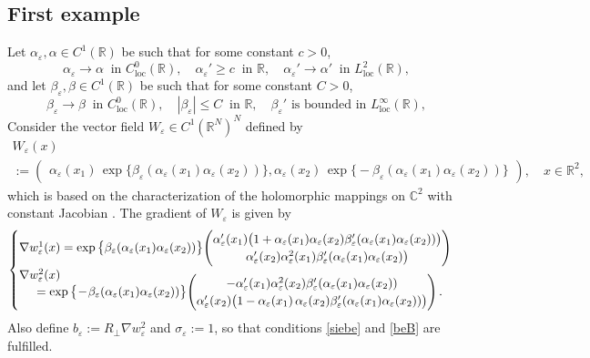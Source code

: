 \documentclass[JEP,XML,SOM,Unicode]{cedram}
\newcommand{\loc}{\mathrm{loc}}
\let\al\alpha
\let \be \beta
\def \RR {\mathbb R}
\def \CC {\mathbb C}
\theoremstyle{plain}
\theoremstyle{definition}
\begin{document}
\subsection{First example}\label{ss.exa1}
Let $\al_\varepsilon,\al\in C^1(\RR)$ be such that for some constant $c>0$,
\begin{equation}\label{ae}
\al_\varepsilon\to\al\;\;\mbox{in }C^0_\loc(\RR),\quad \al_\varepsilon'\geq c\;\;\mbox{in }\RR,\quad\al_\varepsilon'\to\al'\;\;\mbox{in }L^2_\loc(\RR),
\end{equation}
and let $\be_\varepsilon,\be\in C^1(\RR)$ be such that for some constant $C>0$,
\begin{equation}\label{bee}
\be_\varepsilon\to\be\;\;\mbox{in }C^0_\loc(\RR),\quad |\be_\varepsilon|\leq C\;\;\mbox{in }\RR,\quad \be_\varepsilon'\mbox{ is bounded in }L^\infty_\loc(\RR),
\end{equation}
Consider the vector field $W_\varepsilon\in C^1(\RR^N)^N$ defined by
\begin{multline}\label{Wecj}
W_\varepsilon(x)\\
:=\begin{pmatrix}\al_\varepsilon(x_1)\,\exp\big\{\be_\varepsilon(\al_\varepsilon(x_1)\al_\varepsilon(x_2))\big\},\al_\varepsilon(x_2)\,\exp\big\{\!-\!\be_\varepsilon(\al_\varepsilon(x_1)\al_\varepsilon(x_2))\big\}\end{pmatrix},\quad
x\in\RR^2,
\end{multline}
which is based on the characterization of the holomorphic mappings on $\CC^2$ with constant Jacobian \cite{Nis}.
The gradient of $W_\varepsilon$ is given by
\[
\begin{cases}
\nabla w_\varepsilon^1(x)=\exp\big\{\be_\varepsilon(\al_\varepsilon(x_1)\al_\varepsilon(x_2))\big\}\!\begin{pmatrix}
\al_\varepsilon'(x_1)\big(1+\al_\varepsilon(x_1)\al_\varepsilon(x_2)\be_\varepsilon'(\al_\varepsilon(x_1)\al_\varepsilon(x_2))\big)
\\
\al_\varepsilon'(x_2)\al_\varepsilon^2(x_1)\be_\varepsilon'(\al_\varepsilon(x_1)\al_\varepsilon(x_2)\big)
\end{pmatrix}
\\
\nabla w_\varepsilon^2(x)\\[-8pt]
\hspace*{.5cm}=\exp\big\{\!-\!\be_\varepsilon(\al_\varepsilon(x_1)\al_\varepsilon(x_2))\big\}\!\begin{pmatrix}
-\al_\varepsilon'(x_1)\al_\varepsilon^2(x_2)\be_\varepsilon'(\al_\varepsilon(x_1)\al_\varepsilon(x_2))
\\
\al_\varepsilon'(x_2)\big(1-\al_\varepsilon(x_1)\,\al_\varepsilon(x_2)\be_\varepsilon'(\al_\varepsilon(x_1)\al_\varepsilon(x_2))\big)
\end{pmatrix}.
\end{cases}
\]
Also define $b_\varepsilon:=R_\perp\nabla w_\varepsilon^2$ and $\sigma_\varepsilon:=1$, so that conditions \eqref{siebe} and \eqref{beB} are fulfilled.
\end{document}
